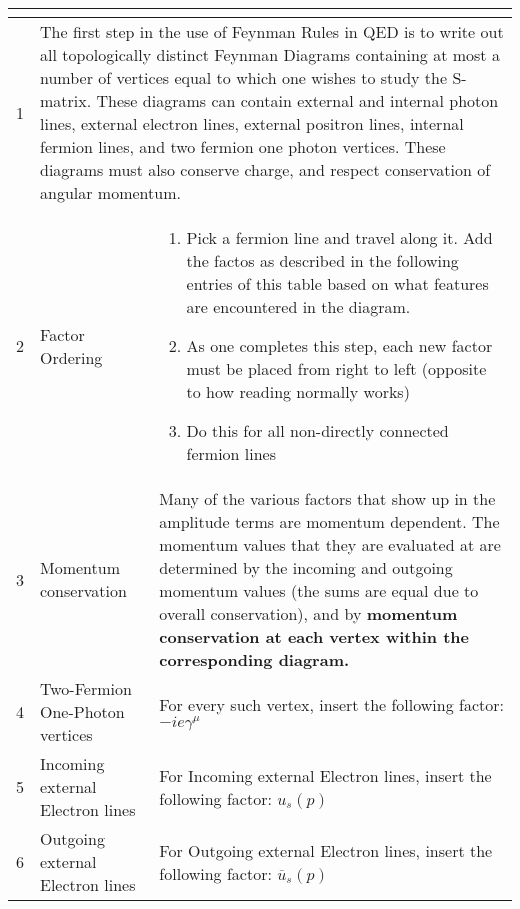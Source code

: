 \documentclass[a4]{article}
\begin{document}
    \begingroup
        \begin{longtable}{| p{} | p{} | p{} |}
            \hline
            \multicolumn{3}{|p{0.75\textwidth}|}{\centering{\textbf{The Feynman Rules for QED}}} \\
            \hline
            1 & \multicolumn{2}{|p{0.75\textwidth}|}{The first step in  the use of Feynman Rules in QED is to write out all topologically distinct Feynman Diagrams containing
            at most a number of vertices equal to which one wishes to study the S-matrix. These diagrams can contain external and internal
            photon lines, external electron lines, external positron lines, internal fermion lines, and two fermion one photon vertices.
            These diagrams must also conserve charge, and respect conservation of angular momentum.} \\
            \hline
            2 & Factor Ordering & 
            \begin{enumerate}
                \item Pick a fermion line and travel along it. Add the factos as described in the following entries of this
                table based on what features are encountered in the diagram.
                \item As one completes this step, each new factor must be placed from right to left (opposite to how reading
                normally works)
                \item Do this for all non-directly connected fermion lines
            \end{enumerate} \\
            \hline
            3 & Momentum conservation & 
            Many of the various factors that show up in the amplitude terms are momentum
            dependent. The momentum values that they are evaluated at are determined by the incoming and outgoing momentum
            values (the sums are equal due to overall conservation), and by \textbf{momentum conservation at each vertex
            within the corresponding diagram.}\\
            \hline
            4 & Two-Fermion One-Photon vertices & For every such vertex, insert the following factor: $- i e \gamma^{\mu}$ \\
            \hline
            5 & Incoming external Electron lines & For Incoming external Electron lines, insert the following factor: $u_{s} (p)$ \\
            \hline
            6 & Outgoing external Electron lines & For Outgoing external Electron lines, insert the following factor: $\overline{u}_{s} (p)$ \\

\end{longtable}
\end{document}
